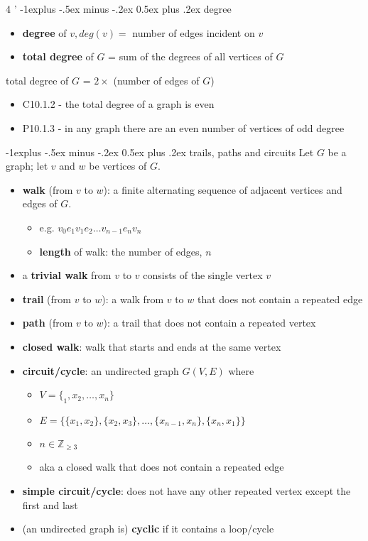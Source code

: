 \documentclass[10pt, landscape]{article}
\makeatletter
\renewcommand{\subsection}{\@startsection{subsection}{2}{0mm}%
                                {-1explus -.5ex minus -.2ex}%
                                {0.5ex plus .2ex}%
                                {\normalfont\normalsize\bfseries}}
\makeatother
\begin{document}
\begin{multicols}{4
    '}
\subsection{degree}
\begin{itemize}
    \item \textbf{degree} of $v, deg(v) =$ number of edges incident on $v$
    \item \textbf{total degree} of $G$ = sum of the degrees of all vertices of $G$
\end{itemize}
\centerline{total degree of $G$ = $2 \times $ (number of edges of $G$)}
\begin{itemize}
    \item C10.1.2 - the total degree of a graph is even
    \item P10.1.3 - in any graph there are an even number of vertices of odd degree
\end{itemize}

\subsection{trails, paths and circuits}
Let $G$ be a graph; let $v$ and $w$ be vertices of $G$.
\begin{itemize}
    \item \textbf{walk} (from $v$ to $w$): a finite alternating sequence of adjacent vertices and edges of $G$.
    \begin{itemize}
        \item e.g. $v_0e_1v_1e_2\dots v_{n-1}e_nv_n$
        \item \textbf{length} of walk: the number of edges, $n$
    \end{itemize}
    \item a \textbf{trivial walk} from $v$ to $v$ consists of the single vertex $v$
    \item \textbf{trail} (from $v$ to $w$): a walk from $v$ to $w$ that does not contain a repeated edge
    \item \textbf{path} (from $v$ to $w$): a trail that does not contain a repeated vertex
    \item \textbf{closed walk}: walk that starts and ends at the same vertex
    \item \textbf{circuit/cycle}: an undirected graph $G(V, E)$ where 
        \begin{itemize}
            \item $V = \{_1, x_2, \dots, x_n\}$
            \item $E = \{\{x_1, x_2\}, \{x_2, x_3\}, \dots, \{x_{n-1}, x_n\}, \{x_n, x_1\}\}$
            \item $n \in \mathbb{Z}_{\geq 3}$
            \item aka a closed walk that does not contain a repeated edge
        \end{itemize}
    \item \textbf{simple circuit/cycle}: does not have any other repeated vertex except the first and last
    \item (an undirected graph is) \textbf{cyclic} if it contains a loop/cycle
\end{itemize}


\end{multicols}
\end{document}
